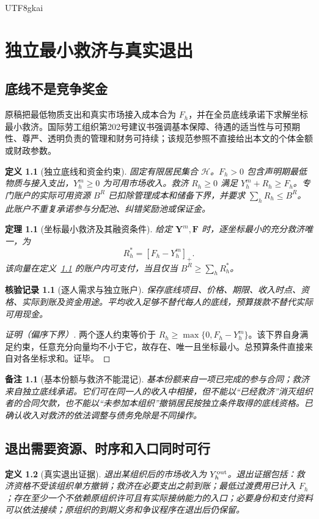 \documentclass[12pt,a4paper,openany]{report}
\newtheorem{definition}{定义}[chapter]
\newtheorem{theorem}{定理}[chapter]
\newtheorem{remark}{备注}[chapter]
\newtheorem{Certificate}{核验记录}[chapter]
\newcommand{\Hist}{\mathcal H}
\begin{document}
\begin{CJK*}{UTF8}{gkai}
\chapter{独立最小救济与真实退出}
\label{chap:exit}
\section{底线不是竞争奖金}
原稿把最低物质支出和真实市场接入成本合为 $F_h$，并在全员底线承诺下求解坐标最小救济\cite{SourceMarket}。国际劳工组织第202号建议书强调基本保障、待遇的适当性与可预期性、尊严、透明负责的管理和财务可持续\cite{ILO202}；该规范参照不直接给出本文的个体金额或财政参数。

\begin{definition}[独立底线和资金约束]
\label{def:floor}
固定有限居民集合 $\Hist$。$F_h>0$ 包含声明期最低物质与接入支出，$Y_h^m\ge0$ 为可用市场收入。救济 $R_h\ge0$ 满足 $Y_h^m+R_h\ge F_h$。专门账户的实际可用资源 $B^R$ 已扣除管理成本和储备下界，并要求 $\sum_hR_h\le B^R$。此账户不重复承诺参与分配池、纠错奖励池或保证金。
\end{definition}

\begin{theorem}[坐标最小救济及其融资条件]
\label{thm:floor}
给定 $\mathbf Y^m,\mathbf F$ 时，逐坐标最小的充分救济唯一，为
\[
 R_h^*=[F_h-Y_h^m]_+.
\]
该向量在定义~\ref{def:floor} 的账户内可支付，当且仅当 $B^R\ge\sum_hR_h^*$。
\end{theorem}
\begin{Certificate}[逐人需求与独立账户]
保存底线项目、价格、期限、收入时点、资格、实际到账及资金用途。平均收入足够不替代每人的底线，预算拨款不替代实际可用现金。
\end{Certificate}
\begin{proof}[证明（偏序下界）]
两个逐人约束等价于 $R_h\ge\max\{0,F_h-Y_h^m\}$。该下界自身满足约束，任意充分向量均不小于它，故存在、唯一且坐标最小。总预算条件直接来自对各坐标求和。证毕。
\end{proof}

\begin{remark}[基本份额与救济不能混记]
基本份额来自一项已完成的参与合同；救济来自独立底线承诺。它们可在同一人的收入中相接，但不能以“已经救济”消灭组织者的合同欠款，也不能以“未参加本组织”撤销居民按独立条件取得的底线资格。已确认收入对救济的依法调整与债务免除是不同操作。
\end{remark}

\section{退出需要资源、时序和入口同时可行}
\begin{definition}[真实退出证据]
\label{def:exit}
退出某组织后的市场收入为 $Y_h^{\rm out}$。退出证据包括：救济资格不受该组织单方撤销；救济在必要支出之前到账；最低过渡费用已计入 $F_h$；存在至少一个不依赖原组织许可且有实际接纳能力的入口；必要身份和支付资料可以依法接续；原组织的到期义务和争议程序在退出后仍保留。
\end{definition}


\end{CJK*}
\end{document}
